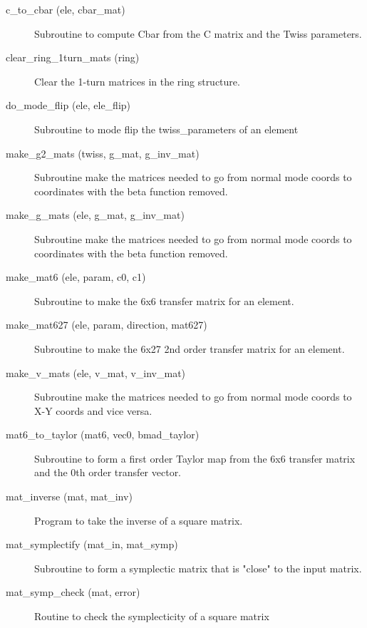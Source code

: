 \begin{description}

\item[c\_to\_cbar (ele, cbar\_mat)] \Newline
Subroutine to compute Cbar from the C matrix and the Twiss parameters. 

\item[clear\_ring\_1turn\_mats (ring)] \Newline
Clear the 1-turn matrices in the ring structure. 

\item[do\_mode\_flip (ele, ele\_flip)] \Newline
Subroutine to mode flip the twiss\_parameters of an element 

\item[make\_g2\_mats (twiss, g\_mat, g\_inv\_mat)] \Newline
Subroutine make the matrices needed to go from normal mode coords to 
coordinates with the beta function removed. 

\item[make\_g\_mats (ele, g\_mat, g\_inv\_mat)] \Newline
Subroutine make the matrices needed to go from normal mode coords to 
coordinates with the beta function removed. 

\item[make\_mat6 (ele, param, c0, c1)] \Newline
Subroutine to make the 6x6 transfer matrix for an element. 

\item[make\_mat627 (ele, param, direction, mat627)] \Newline
Subroutine to make the 6x27 2nd order transfer matrix for an element. 

\item[make\_v\_mats (ele, v\_mat, v\_inv\_mat)] \Newline
Subroutine make the matrices needed to go from normal mode coords to X-Y 
coords and vice versa. 

\item[mat6\_to\_taylor (mat6, vec0, bmad\_taylor)] \Newline
Subroutine to form a first order Taylor map from the 6x6 transfer matrix 
and the 0th order transfer vector. 

\item[mat\_inverse (mat, mat\_inv)] \Newline
Program to take the inverse of a square matrix. 

\item[mat\_symplectify (mat\_in, mat\_symp)] \Newline
Subroutine to form a symplectic matrix that is "close" to the input matrix. 

\item[mat\_symp\_check (mat, error)] \Newline
Routine to check the symplecticity of a square matrix 


\end{description}
